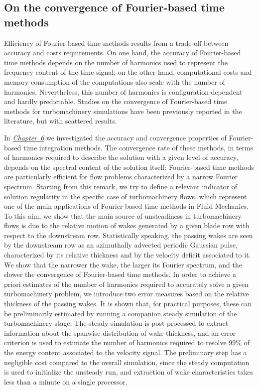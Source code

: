 \subsection*{On the convergence of Fourier-based time methods}

Efficiency of Fourier-based time methods results 
from a trade-off between accuracy and 
costs requirements.
On one hand, the accuracy of Fourier-based
time methods depends on the number of harmonics
used to represent the frequency content of the time 
signal; on the other hand, computational costs and 
memory consumption of the computations also scale
with the number of harmonics. 
Nevertheless, this number of harmonics is configuration-dependent 
and hardly predictable. Studies on the convergence of 
Fourier-based time methods for turbomachinery simulations 
have been previously reported in the literature, 
but with scattered results. 

In \hyperref[cha:limitations_convergence]{\emph{Chapter~6}}
we investigated the accuracy and convergence properties 
of Fourier-based time integration methods. The convergence rate 
of these methods, in terms of harmonics required to describe the solution 
with a given level of accuracy, depends on the spectral content of the 
solution itself: Fourier-based time methods are particularly efficient 
for flow problems characterized by a narrow Fourier 
spectrum. Starting from this remark, we try to define a relevant 
indicator of solution regularity in the specific case of turbomachinery 
flows, which represent one of the main applications of Fourier-based 
time methods in Fluid Mechanics.
To this aim, we show that the main source of unsteadiness in 
turbomachinery flows is due to the relative motion of wakes 
generated by a given blade row with respect to the downstream row. 
Statistically speaking, the passing wakes are seen by the downstream 
row as an azimuthally advected periodic Gaussian pulse, 
characterized by its relative thickness
and by the velocity deficit 
associated to it. We show that the narrower the wake, the larger 
its Fourier spectrum, and the slower the convergence of Fourier-based time methods.
In order to achieve a priori estimates of the number of 
harmonics required to accurately solve a given turbomachinery 
problem, we introduce two error measures based on the relative 
thickness of the passing wakes. It is shown that, for practical 
purposes, these can be preliminarily estimated by running a 
companion steady simulation of the turbomachinery stage. The 
steady simulation is post-processed to extract information about 
the spanwise distribution of wake thickness, and an error criterion 
is used to estimate the number of harmonics required to resolve 99\% 
of the energy content associated to the velocity signal. The 
preliminary step has a negligible cost compared to the overall 
simulation, since the steady computation is used to initialize 
the unsteady run, and extraction of wake characteristics takes 
less than a minute on a single processor. 

